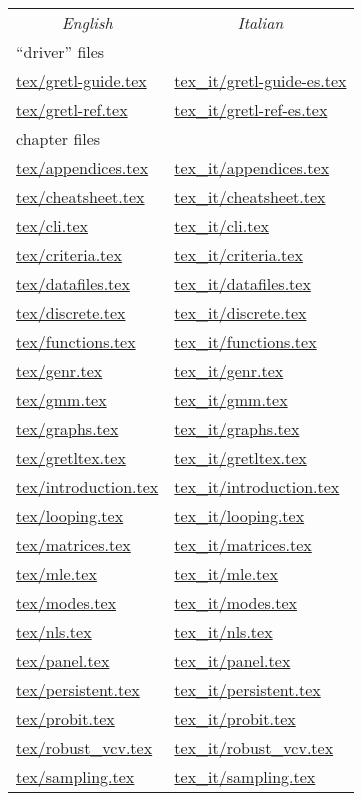 \documentclass{article}
\begin{document}
\begin{table}[htbp]
\begin{center}
\begin{tabular}{ll}
\multicolumn{1}{c}{\textit{English}} & 
\multicolumn{1}{c}{\textit{Italian}} \\[6pt]
\multicolumn{2}{l}{``driver'' files} \\
\url{tex/gretl-guide.tex} & \url{tex_it/gretl-guide-es.tex} \\
\url{tex/gretl-ref.tex} & \url{tex_it/gretl-ref-es.tex} \\[6pt]
\multicolumn{2}{l}{chapter files} \\
\url{tex/appendices.tex} & \url{tex_it/appendices.tex} \\
\url{tex/cheatsheet.tex} & \url{tex_it/cheatsheet.tex} \\
\url{tex/cli.tex} & \url{tex_it/cli.tex} \\
\url{tex/criteria.tex} & \url{tex_it/criteria.tex} \\
\url{tex/datafiles.tex} & \url{tex_it/datafiles.tex} \\
\url{tex/discrete.tex} & \url{tex_it/discrete.tex} \\
\url{tex/functions.tex} & \url{tex_it/functions.tex} \\
\url{tex/genr.tex} & \url{tex_it/genr.tex} \\
\url{tex/gmm.tex} & \url{tex_it/gmm.tex} \\
\url{tex/graphs.tex} & \url{tex_it/graphs.tex} \\
\url{tex/gretltex.tex} & \url{tex_it/gretltex.tex} \\
\url{tex/introduction.tex} & \url{tex_it/introduction.tex} \\
\url{tex/looping.tex} & \url{tex_it/looping.tex} \\
\url{tex/matrices.tex} & \url{tex_it/matrices.tex} \\
\url{tex/mle.tex} & \url{tex_it/mle.tex} \\
\url{tex/modes.tex} & \url{tex_it/modes.tex} \\
\url{tex/nls.tex} & \url{tex_it/nls.tex} \\
\url{tex/panel.tex} & \url{tex_it/panel.tex} \\
\url{tex/persistent.tex} & \url{tex_it/persistent.tex} \\
\url{tex/probit.tex} & \url{tex_it/probit.tex} \\
\url{tex/robust_vcv.tex} & \url{tex_it/robust_vcv.tex} \\
\url{tex/sampling.tex} & \url{tex_it/sampling.tex} \\

\end{tabular}
\end{center}
\end{table}
\end{document}
